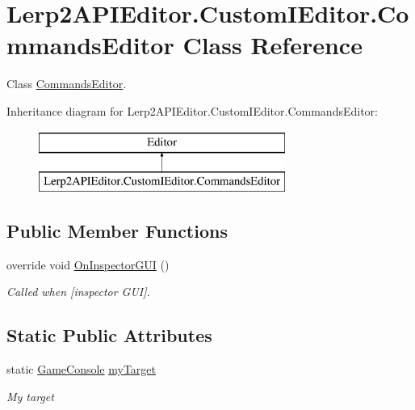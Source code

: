 \hypertarget{class_lerp2_a_p_i_editor_1_1_custom_i_editor_1_1_commands_editor}{}\section{Lerp2\+A\+P\+I\+Editor.\+Custom\+I\+Editor.\+Commands\+Editor Class Reference}
\label{class_lerp2_a_p_i_editor_1_1_custom_i_editor_1_1_commands_editor}


Class \hyperlink{class_lerp2_a_p_i_editor_1_1_custom_i_editor_1_1_commands_editor}{Commands\+Editor}.  


Inheritance diagram for Lerp2\+A\+P\+I\+Editor.\+Custom\+I\+Editor.\+Commands\+Editor\+:\begin{figure}[H]
\begin{center}
\leavevmode
\includegraphics[height=2.000000cm]{class_lerp2_a_p_i_editor_1_1_custom_i_editor_1_1_commands_editor}
\end{center}
\end{figure}
\subsection*{Public Member Functions}
\begin{DoxyCompactItemize}
\item 
override void \hyperlink{class_lerp2_a_p_i_editor_1_1_custom_i_editor_1_1_commands_editor_a57aa4aadb86cb1eb731540617b2e8ca4}{On\+Inspector\+G\+UI} ()
\begin{DoxyCompactList}\small\item\em Called when \mbox{[}inspector G\+UI\mbox{]}. \end{DoxyCompactList}\end{DoxyCompactItemize}
\subsection*{Static Public Attributes}
\begin{DoxyCompactItemize}
\item 
static \hyperlink{class_lerp2_a_p_i_1_1_game_1_1_game_console}{Game\+Console} \hyperlink{class_lerp2_a_p_i_editor_1_1_custom_i_editor_1_1_commands_editor_a3167bcd0435cbdbf044b2e1f61d55b94}{my\+Target}
\begin{DoxyCompactList}\small\item\em My target \end{DoxyCompactList}\end{DoxyCompactItemize}

